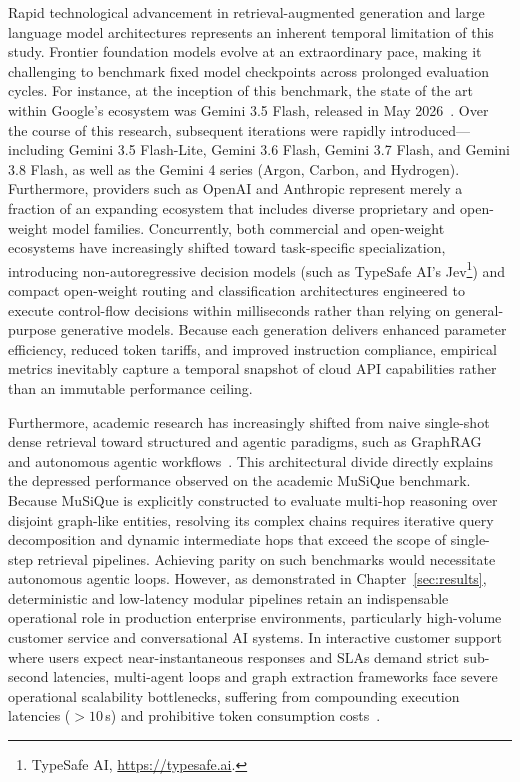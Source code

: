 Rapid technological advancement in retrieval-augmented generation and large language model architectures represents an inherent temporal limitation of this study. Frontier foundation models evolve at an extraordinary pace, making it challenging to benchmark fixed model checkpoints across prolonged evaluation cycles. For instance, at the inception of this benchmark, the state of the art within Google's ecosystem was Gemini 3.5 Flash, released in May 2026~\citep{GoogleCloudModelVersions}. Over the course of this research, subsequent iterations were rapidly introduced---including Gemini 3.5 Flash-Lite, Gemini 3.6 Flash, Gemini 3.7 Flash, and Gemini 3.8 Flash, as well as the Gemini 4 series (Argon, Carbon, and Hydrogen). Furthermore, providers such as OpenAI and Anthropic represent merely a fraction of an expanding ecosystem that includes diverse proprietary and open-weight model families. Concurrently, both commercial and open-weight ecosystems have increasingly shifted toward task-specific specialization, introducing non-autoregressive decision models (such as TypeSafe AI's Jev\footnote{TypeSafe AI, \url{https://typesafe.ai}.}) and compact open-weight routing and classification architectures engineered to execute control-flow decisions within milliseconds rather than relying on general-purpose generative models. Because each generation delivers enhanced parameter efficiency, reduced token tariffs, and improved instruction compliance, empirical metrics inevitably capture a temporal snapshot of cloud API capabilities rather than an immutable performance ceiling.

Furthermore, academic research has increasingly shifted from naive single-shot dense retrieval toward structured and agentic paradigms, such as GraphRAG~\citep{edge2024localglobalgraphrag, procko2024graphrag} and autonomous agentic workflows~\citep{lumer2026rethinking, singh2025agentic}. This architectural divide directly explains the depressed performance observed on the academic MuSiQue benchmark. Because MuSiQue is explicitly constructed to evaluate multi-hop reasoning over disjoint graph-like entities, resolving its complex chains requires iterative query decomposition and dynamic intermediate hops that exceed the scope of single-step retrieval pipelines. Achieving parity on such benchmarks would necessitate autonomous agentic loops. However, as demonstrated in Chapter~\ref{sec:results}, deterministic and low-latency modular pipelines retain an indispensable operational role in production enterprise environments, particularly high-volume customer service and conversational AI systems. In interactive customer support where users expect near-instantaneous responses and SLAs demand strict sub-second latencies, multi-agent loops and graph extraction frameworks face severe operational scalability bottlenecks, suffering from compounding execution latencies ($>10$\,s) and prohibitive token consumption costs~\citep{chen2026logicrag, lumer2026rethinking}.

